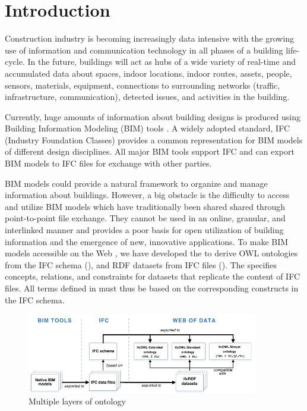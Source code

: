\section{Introduction}
\label{sec:Introduction}

Construction industry is becoming increasingly data intensive with the growing use of
information and communication technology in all phases of a building life-cycle. 
In the future, buildings will act as hubs of a wide variety of real-time and accumulated data about
spaces, indoor locations, indoor routes, assets, people, sensors, materials, equipment, connections
to surrounding networks (traffic, infrastructure, communication), detected issues, and 
activities in the building.

Currently, huge amounts of information about building designs is produced  
using Building Information Modeling (BIM) tools \cite{eastman2011bim}. A widely adopted standard, 
IFC (Industry Foundation Classes) \cite{ISO16739,liebich2010unveiling} provides a common representation for BIM models of 
different design disciplines. All major BIM tools support IFC and can export BIM models to IFC files for exchange with other parties.

BIM models could provide a natural framework to organize and manage information about buildings. However, a big obstacle is the difficulty to access and utilize BIM models which have traditionally been shared shared through point-to-point file exchange. They cannot be used in an online, granular, and 
interlinked manner and provides a poor basis for open utilization of building information and the 
emergence of new, innovative applications.
To make BIM models accessible on the Web \cite{torma2014wobd}, we have developed the 
 to 
derive OWL ontologies from the IFC schema (\ifcowl{}), and RDF datasets from IFC files 
(\ifcrdf{}). The \ifcowl{} specifies concepts, relations, and constraints for \ifcrdf{} datasets that replicate the content of IFC files. 
All terms defined in \ifcowl{}  must thus be based on the corresponding constructs in 
the IFC schema. 

\begin{figure}[h]
\centering
\includegraphics[angle=0,width=0.9\textwidth]{images/ifcOWL-multilayers.png}
\caption{Multiple layers of \ifcowl{} ontology}
\label{fig:ifcOWL-layers}
\end{figure}

